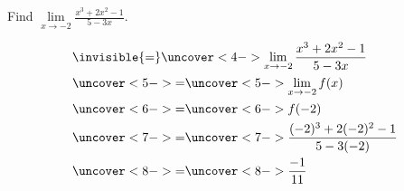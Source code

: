 \begin{frame}
\begin{example}
Find $\lim\limits_{x\rightarrow -2}\frac{x^3+2x^2-1}{5-3x}$.

\begin{align*}
& \invisible{=} \uncover<4->{\lim_{x\rightarrow -2} \frac{x^3 + 2x^2 - 1}{5-3x}}\\
& \uncover<5->{ = }  
\uncover<5->{\lim_{x\rightarrow -2}f(x)}\\
& \uncover<6->{ = }  
\uncover<6->{f(-2)}\\
& \uncover<7->{ = }  
\uncover<7->{\frac{(-2)^3 + 2(-2)^2 - 1}{5 - 3(-2)}}\\
& \uncover<8->{ = }  
\uncover<8->{\frac{-1}{11}}
\end{align*}
\end{example}
\end{frame}
